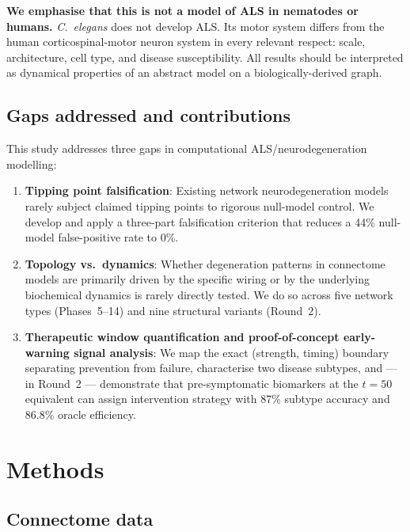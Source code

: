 \documentclass[12pt,a4paper]{article}
\begin{document}
\textbf{We emphasise that this is not a model of ALS in nematodes or humans.}
\textit{C.~elegans} does not develop ALS. Its motor system differs from the human
corticospinal-motor neuron system in every relevant respect: scale, architecture, cell type,
and disease susceptibility. All results should be interpreted as dynamical properties of an
abstract model on a biologically-derived graph.

\subsection{Gaps addressed and contributions}

This study addresses three gaps in computational ALS/neurodegeneration modelling:

\begin{enumerate}
\item \textbf{Tipping point falsification}: Existing network neurodegeneration models rarely
subject claimed tipping points to rigorous null-model control. We develop and apply a
three-part falsification criterion that reduces a 44\% null-model false-positive rate to 0\%.

\item \textbf{Topology vs.\ dynamics}: Whether degeneration patterns in connectome models are
primarily driven by the specific wiring or by the underlying biochemical dynamics is rarely
directly tested. We do so across five network types (Phases~5--14) and nine structural variants
(Round~2).

\item \textbf{Therapeutic window quantification and proof-of-concept early-warning signal analysis}: We map the exact
(strength, timing) boundary separating prevention from failure, characterise two disease
subtypes, and --- in Round~2 --- demonstrate that pre-symptomatic biomarkers at the $t=50$
equivalent can assign intervention strategy with 87\% subtype accuracy and 86.8\% oracle
efficiency.
\end{enumerate}

\section{Methods}

\subsection{Connectome data}
\end{document}
